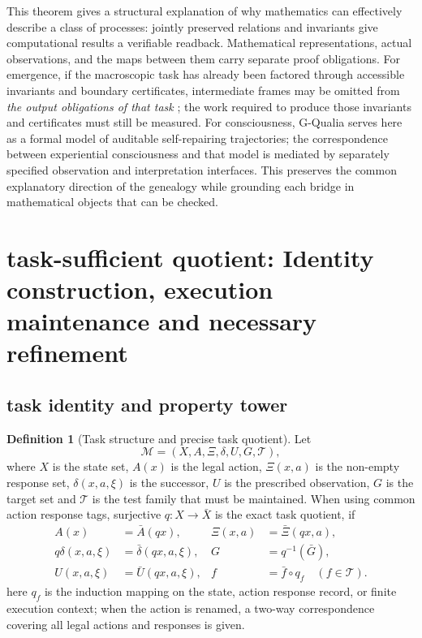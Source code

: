 \documentclass[11pt,a4paper]{article}
\theoremstyle{plain}
\theoremstyle{definition}
\newtheorem{definition}[theorem]{Definition}
\theoremstyle{remark}
\begin{document}
\begin{CJK*}
This theorem gives a structural explanation of why mathematics can effectively describe a class of processes: jointly preserved relations and invariants give computational results a verifiable readback. Mathematical representations, actual observations, and the maps between them carry separate proof obligations. For emergence, if the macroscopic task has already been factored through accessible invariants and boundary certificates, intermediate frames may be omitted from \emph { the output obligations of that task }; the work required to produce those invariants and certificates must still be measured. For consciousness, G-Qualia serves here as a formal model of auditable self-repairing trajectories; the correspondence between experiential consciousness and that model is mediated by separately specified observation and interpretation interfaces. This preserves the common explanatory direction of the genealogy while grounding each bridge in mathematical objects that can be checked.

\section { task-sufficient quotient: Identity construction, execution maintenance and necessary refinement }\label{pc:quotient}


\subsection { task identity and property tower }

\begin{definition}
[Task structure and precise task quotient]Let \[
 \mathcal M=(X,A,\Xi,\delta,U,G,\mathcal T),
\] where $X$ is the state set, $A(x)$ is the legal action, $\Xi(x,a)$ is the non-empty response set, $\delta(x,a,\xi)$ is the successor, $U$ is the prescribed observation, $G$ is the target set and $\mathcal T$ is the test family that must be maintained. When using common action response tags, surjective $q:X\to\bar X$ is the exact task quotient, if \begin{equation}
\label{pc:eq-exact}
\begin{aligned}
 A(x)&=\bar A(qx),& \Xi(x,a)&=\bar\Xi(qx,a),\\
 q\delta(x,a,\xi)&=\bar\delta(qx,a,\xi),& G&=q^{-1}(\bar G),\\
 U(x,a,\xi)&=\bar U(qx,a,\xi),& f&=\bar f\circ q_f\quad(f\in\mathcal T).
\end{aligned}
\end{equation} here $q_f$ is the induction mapping on the state, action response record, or finite execution context; when the action is renamed, a two-way correspondence covering all legal actions and responses is given.\end{definition}



\end{CJK*}
\end{document}
